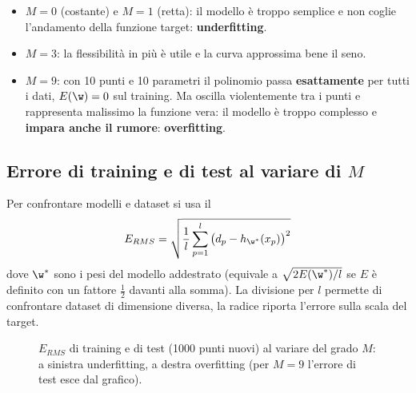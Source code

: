 \begin{itemize}
  \item \textbf{$M=0$} (costante) e \textbf{$M=1$} (retta): il modello è troppo semplice e non coglie l'andamento
        della funzione target: \textbf{underfitting}.
  \item \textbf{$M=3$}: la flessibilità in più è utile e la curva approssima bene il seno.
  \item \textbf{$M=9$}: con 10 punti e 10 parametri il polinomio passa \textbf{esattamente} per tutti i dati,
        $E(\w)=0$ sul training. Ma oscilla violentemente tra i punti e rappresenta malissimo la funzione vera: il
        modello è troppo complesso e \textbf{impara anche il rumore}: \textbf{overfitting}.
\end{itemize}

\subsection{Errore di training e di test al variare di $M$}

Per confrontare modelli e dataset si usa il 
\[
E_{RMS} = \sqrt{\frac1l\sum_{p=1}^{l}\big(d_p - h_{\w^*}(x_p)\big)^2}
\]
dove $\w^*$ sono i pesi del modello addestrato (equivale a $\sqrt{2E(\w^*)/l}$ se $E$ è definito con un fattore
$\tfrac12$ davanti alla somma). La divisione per $l$ permette di confrontare dataset di dimensione diversa, la
radice riporta l'errore sulla scala del target.

\begin{figure}[ht]
\centering
{}
\caption{$E_{RMS}$ di training e di test (1000 punti nuovi) al variare del grado $M$: a sinistra underfitting, a
destra overfitting (per $M=9$ l'errore di test esce dal grafico).}
\label{fig:rms-M}
\end{figure}

